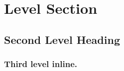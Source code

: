 \section{Level Section}
\blindtext
\blinditemize
\subsection{Second Level Heading}
\blindtext
\blindenumerate
\subsubsection{Third level inline.}
\blindtext

